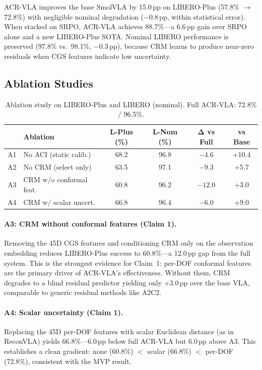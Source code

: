 \documentclass[letterpaper]{article}
\begin{document}
ACR-VLA improves the base SmolVLA by 15.0\,pp on LIBERO-Plus (57.8\% $\to$ 72.8\%) with negligible nominal degradation ($-0.8$\,pp, within statistical error).
When stacked on SRPO, ACR-VLA achieves 88.7\%---a 6.6\,pp gain over SRPO alone and a new LIBERO-Plus SOTA.
Nominal LIBERO performance is preserved (97.8\% vs.\ 98.1\%, $-0.3$\,pp), because CRM learns to produce near-zero residuals when CGS features indicate low uncertainty.

\subsection{Ablation Studies}
\label{sec:ablations}

\begin{table}[h]
\centering
\caption{Ablation study on LIBERO-Plus and LIBERO (nominal). Full ACR-VLA: 72.8\% / 96.5\%.}
\label{tab:ablation}
\begin{tabular}{llcccc}
\toprule
& \textbf{Ablation} & \textbf{L-Plus (\%)} & \textbf{L-Nom (\%)} & $\boldsymbol{\Delta}$ \textbf{vs Full} & \textbf{vs Base} \\
\midrule
A1 & No ACI (static calib.) & 68.2 & 96.8 & $-4.6$ & +10.4 \\
A2 & No CRM (select only) & 63.5 & 97.1 & $-9.3$ & +5.7 \\
A3 & CRM w/o conformal feat. & 60.8 & 96.2 & $-12.0$ & +3.0 \\
A4 & CRM w/ scalar uncert. & 66.8 & 96.4 & $-6.0$ & +9.0 \\
\bottomrule
\end{tabular}
\end{table}

\paragraph{A3: CRM without conformal features (Claim 1).}
Removing the 45D CGS features and conditioning CRM only on the observation embedding reduces LIBERO-Plus success to 60.8\%---a 12.0\,pp gap from the full system.
This is the strongest evidence for Claim~1: per-DOF conformal features are the primary driver of ACR-VLA's effectiveness.
Without them, CRM degrades to a blind residual predictor yielding only +3.0\,pp over the base VLA, comparable to generic residual methods like A2C2.

\paragraph{A4: Scalar uncertainty (Claim 1).}
Replacing the 45D per-DOF features with scalar Euclidean distance (as in ReconVLA) yields 66.8\%---6.0\,pp below full ACR-VLA but 6.0\,pp above A3.
This establishes a clean gradient: none (60.8\%) $<$ scalar (66.8\%) $<$ per-DOF (72.8\%), consistent with the MVP result.
\end{document}
